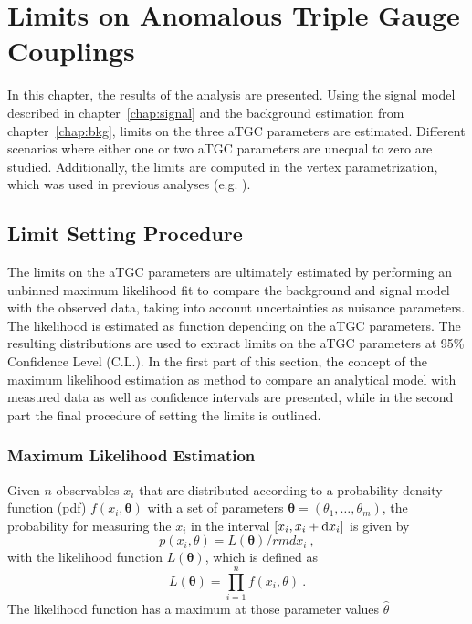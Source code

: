 \chapter{Limits on Anomalous Triple Gauge Couplings}
\label{chap:LimitsonATGCs}


In this chapter, the results of the analysis are presented. Using the signal model described in chapter~\ref{chap:signal} and the background estimation from chapter~\ref{chap:bkg}, limits on the three aTGC parameters are estimated. Different scenarios where either one or two aTGC parameters are unequal to zero are studied. Additionally, the limits are computed in the vertex parametrization, which was used in previous analyses (e.g. \cite{aTGC1,aTGC2}).


\section{Limit Setting Procedure}
The limits on the aTGC parameters are ultimately estimated by performing an unbinned maximum likelihood fit to compare the background and signal model with the observed data, taking into account uncertainties as nuisance parameters. The likelihood is estimated as function depending on the aTGC parameters. The resulting distributions are used to extract limits on the aTGC parameters at 95\% Confidence Level (C.L.). In the first part of this section, the concept of the maximum likelihood estimation as method to compare an analytical model with measured data as well as confidence intervals are presented, while in the second part the final procedure of setting the limits is outlined.
\subsection{Maximum Likelihood Estimation}
\label{subsec:maxlikeest}
Given $n$ observables $x_i$ that are distributed according to a probability density function (pdf) $f(x_i,\mathbf{\theta})$ with a set of parameters $\mathbf{\theta}=(\theta_1,\dots,\theta_m)$, the probability for measuring the $x_i$ in the interval $[x_i,x_i+{\rm d}x_i]$ is given by
\begin{equation}
p(x_i,\theta) = L(\mathbf{\theta}) {/rm d}x_i ~,
\end{equation}
with the likelihood function $L(\mathbf{\theta})$, which is defined as
\begin{equation}
L(\mathbf{\theta}) = \prod_{i=1}^{n} f(x_i,\theta) ~.
\end{equation}
The likelihood function has a maximum at those parameter values $\hat{\theta}$ 

